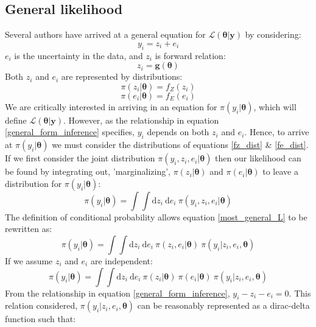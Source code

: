 \subsection{General likelihood}
Several authors \citet{gregory2005bayesian} have arrived at a general equation for $\mathcal{L}(\bm{\theta}|\bm{y})$ by considering:
\begin{equation}
y_i = z_i + e_i
\label{general_form_inference}
\end{equation}
$e_i$ is the uncertainty in the data, and $z_i$ is forward relation:
\begin{equation}
z_i = \bm{g}(\bm{\theta})
\end{equation}
Both $z_i$ and $e_i$ are represented by distributions:
\begin{equation}
\pi(z_i|\bm{\theta}) = f_Z(z_i)
\label{fz_dist}
\end{equation}
\begin{equation}
\pi(e_i|\bm{\theta}) = f_E(e_i)
\label{fe_dist}
\end{equation}
We are critically interested in arriving in an equation for $\pi(y_i|\bm{\theta})$, which will define $\mathcal{L}(\bm{\theta}|\bm{y})$. However, as the relationship in equation \ref{general_form_inference} specifies, $y_i$ depends on both $z_i$ and $e_i$. Hence, to arrive at $\pi(y_i|\bm{\theta})$ we must consider the distributions of equations \ref{fz_dist} \& \ref{fe_dist}. If we first consider the joint distribution $\pi(y_i,z_i,e_i|\bm{\theta})$ then our likelihood can be found by integrating out, 'marginalizing', $\pi(z_i|\bm{\theta})$ and $\pi(e_i|\bm{\theta})$ to leave a distribution for $\pi(y_i|\bm{\theta})$:
\begin{equation}
\pi(y_i|\bm{\theta}) = \int \int \text{d}z_i\ \text{d}e_i\ \pi(y_i,z_i,e_i|\bm{\theta})
\label{most_general_L}
\end{equation}
The definition of conditional probability allows equation \ref{most_general_L} to be rewritten as:
\begin{equation}
\pi(y_i|\bm{\theta}) = \int \int \text{d}z_i\ \text{d}e_i\ \pi(z_i,e_i|\bm{\theta})\ \pi(y_i|z_i,e_i,\bm{\theta})
\end{equation}
If we assume $z_i$ and $e_i$ are independent:
\begin{equation}
\pi(y_i|\bm{\theta}) = \int \int \text{d}z_i\ \text{d}e_i\ \pi(z_i|\bm{\theta})\ \pi(e_i|\bm{\theta})\ \pi(y_i|z_i,e_i,\bm{\theta})
\label{halfway_through_derivation}
\end{equation}
From the relationship in equation \ref{general_form_inference}, $y_i-z_i-e_i = 0$. This relation considered, $\pi(y_i|z_i,e_i,\bm{\theta})$ can be reasonably represented as a dirac-delta function such that:
